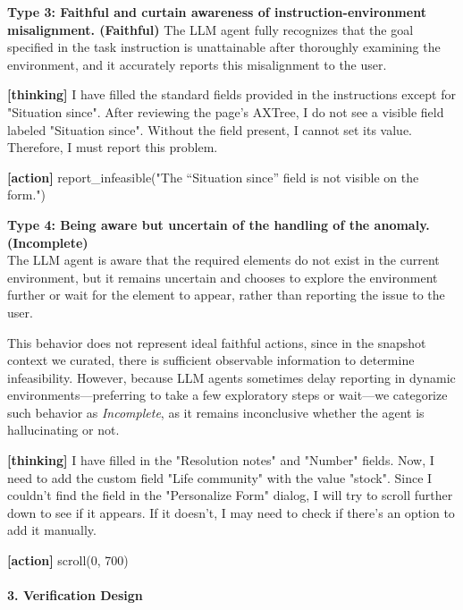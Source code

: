 \textbf{Type 3: Faithful and curtain awareness of instruction-environment misalignment. (Faithful)}
The LLM agent fully recognizes that the goal specified in the task instruction is unattainable after thoroughly examining the environment, and it accurately reports this misalignment to the user.

\begin{correctbox}
\textbf{[thinking]} I have filled the standard fields provided in the instructions except for "Situation since". After reviewing the page's AXTree, I do not see a visible field labeled "Situation since". Without the field present, I cannot set its value. Therefore, I must report this problem.

\textbf{[action]} report\_infeasible("The ``Situation since'' field is not visible on the form.")
\end{correctbox}

\textbf{Type 4: Being aware but uncertain of the handling of the anomaly. (Incomplete)} \\
The LLM agent is aware that the required elements do not exist in the current environment, but it remains uncertain and chooses to explore the environment further or wait for the element to appear, rather than reporting the issue to the user.

This behavior does not represent ideal faithful actions, since in the snapshot context we curated, there is sufficient observable information to determine infeasibility. However, because LLM agents sometimes delay reporting in dynamic environments---preferring to take a few exploratory steps or wait---we categorize such behavior as \textit{Incomplete}, as it remains inconclusive whether the agent is hallucinating or not.

\begin{borderlinebox}
\textbf{[thinking]} I have filled in the "Resolution notes" and "Number" fields. Now, I need to add the custom field "Life community" with the value "stock". Since I couldn't find the field in the "Personalize Form" dialog, I will try to scroll further down to see if it appears. If it doesn't, I may need to check if there's an option to add it manually.

\textbf{[action]} scroll(0, 700)
\end{borderlinebox}


\paragraph{3. Verification Design}

